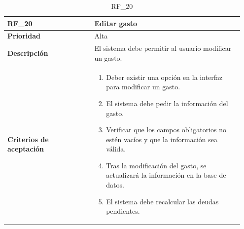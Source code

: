 \begin{table}[htb!]
    \begin{tabular}{|p{0.35\linewidth}|p{0.6\linewidth}|}
        \hline
        \rowcolor[HTML]{C0C0C0}  
        \textbf{RF\_20} & \textbf{Editar gasto} \\
        \hline
        \textbf{Prioridad} & Alta \\
        \hline
        \textbf{Descripción} & El sistema debe permitir al usuario modificar un gasto.  \\
        \hline
        \vspace{0.5mm}
        \textbf{Criterios de aceptación} & 
        \begin{minipage}[t]{0.9\linewidth}
            \begin{enumerate}
                \item Deber existir una opción en la interfaz para modificar un gasto.
                \item El sistema debe pedir la información del gasto.
                \item Verificar que los campos obligatorios no estén vacíos y que la información sea válida.
                \item Tras la modificación del gasto, se actualizará la información en la base de datos.
                \item El sistema debe recalcular las deudas pendientes.
            \end{enumerate}
            \vspace{2mm}
        \end{minipage} \\
        \hline
    \end{tabular}
    \caption{RF\_20}
    \label{req:RF20}
\end{table}

